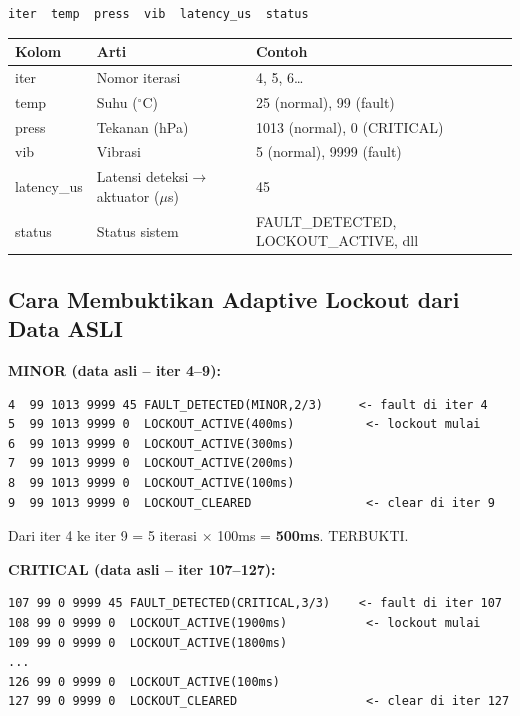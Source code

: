 \documentclass[12pt,a4paper]{article}
\begin{document}
\begin{lstlisting}[style=data]
iter  temp  press  vib  latency_us  status
\end{lstlisting}

\begin{center}
\begin{tabular}{lll}
\toprule
\textbf{Kolom} & \textbf{Arti} & \textbf{Contoh} \\
\midrule
iter   & Nomor iterasi   & 4, 5, 6\dots \\
temp   & Suhu ($^{\circ}\mathrm{C}$) & 25 (normal), 99 (fault) \\
press  & Tekanan (hPa)   & 1013 (normal), 0 (CRITICAL) \\
vib    & Vibrasi         & 5 (normal), 9999 (fault) \\
latency\_us & Latensi deteksi$\rightarrow$aktuator ($\mu$s) & 45 \\
status & Status sistem   & FAULT\_DETECTED, LOCKOUT\_ACTIVE, dll \\
\bottomrule
\end{tabular}
\end{center}

\subsection{Cara Membuktikan Adaptive Lockout dari Data ASLI}

\textbf{MINOR (data asli -- iter 4--9):}

\begin{lstlisting}[style=data]
4  99 1013 9999 45 FAULT_DETECTED(MINOR,2/3)     <- fault di iter 4
5  99 1013 9999 0  LOCKOUT_ACTIVE(400ms)          <- lockout mulai
6  99 1013 9999 0  LOCKOUT_ACTIVE(300ms)
7  99 1013 9999 0  LOCKOUT_ACTIVE(200ms)
8  99 1013 9999 0  LOCKOUT_ACTIVE(100ms)
9  99 1013 9999 0  LOCKOUT_CLEARED                <- clear di iter 9
\end{lstlisting}

Dari iter 4 ke iter 9 = 5 iterasi $\times$ 100ms = \textbf{500ms}. TERBUKTI.

\textbf{CRITICAL (data asli -- iter 107--127):}

\begin{lstlisting}[style=data]
107 99 0 9999 45 FAULT_DETECTED(CRITICAL,3/3)    <- fault di iter 107
108 99 0 9999 0  LOCKOUT_ACTIVE(1900ms)           <- lockout mulai
109 99 0 9999 0  LOCKOUT_ACTIVE(1800ms)
...
126 99 0 9999 0  LOCKOUT_ACTIVE(100ms)
127 99 0 9999 0  LOCKOUT_CLEARED                  <- clear di iter 127
\end{lstlisting}
\end{document}
